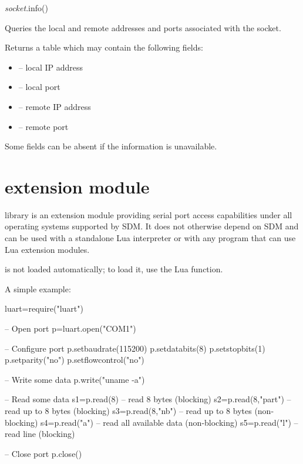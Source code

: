 \documentclass[a4paper,12pt,twoside,extrafontsizes]{memoir}
\begin{document}

\begin{luafuncprototype}
	\emph{socket}.info()
\end{luafuncprototype}

\begin{funcdescr}
	Queries the local and remote addresses and ports associated with the socket.
\end{funcdescr}

\begin{funcret}
	Returns a table which may contain the following fields:
	\begin{itemize}
		\item {} -- local IP address
		\item {} -- local port
		\item {} -- remote IP address
		\item {} -- remote port
	\end{itemize}
	Some fields can be absent if the information is unavailable.
\end{funcret}

\section[luart extension module]{ extension module}

 library is an extension module providing serial port access capabilities under all operating systems supported by SDM. It does not otherwise depend on SDM and can be used with a standalone Lua interpreter or with any program that can use Lua extension modules.

 is not loaded automatically; to load it, use the  Lua function.

A simple example:

\begin{breakshellcmds}\begin{luacode}
luart=require("luart")

-- Open port
p=luart.open("COM1")

-- Configure port
p.setbaudrate(115200)
p.setdatabits(8)
p.setstopbits(1)
p.setparity("no")
p.setflowcontrol("no")

-- Write some data
p.write("uname -a\n")

-- Read some data
s1=p.read(8) -- read 8 bytes (blocking)
s2=p.read(8,"part") -- read up to 8 bytes (blocking)
s3=p.read(8,"nb") -- read up to 8 bytes (non-blocking)
s4=p.read("a") -- read all available data (non-blocking)
s5=p.read("l") -- read line (blocking)

-- Close port
p.close()
\end{luacode}\end{breakshellcmds}
\end{document}

